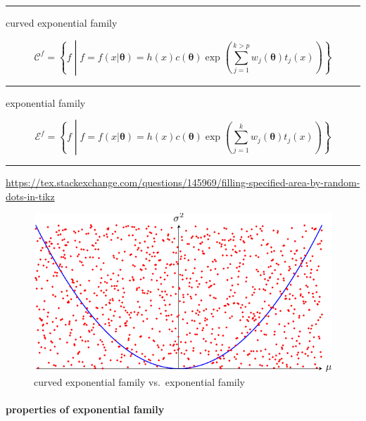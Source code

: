 \documentclass[
]{book}
\theoremstyle{definition}
\theoremstyle{definition}
\theoremstyle{definition}
\theoremstyle{definition}
\theoremstyle{remark}
\begin{document}
\begin{center}\rule{0.5\linewidth}{0.5pt}\end{center}

curved exponential family

\[
\mathcal{C}^{f}=\left\{ f\middle|f=f\left(x|\boldsymbol{\theta}\right)=h\left(x\right)c\left(\boldsymbol{\theta}\right)\exp\left(\sum\limits _{j=1}^{k>p}w_{{\scriptscriptstyle j}}\left(\boldsymbol{\theta}\right)t_{{\scriptscriptstyle j}}\left(x\right)\right)\right\} 
\]

\begin{center}\rule{0.5\linewidth}{0.5pt}\end{center}

exponential family

\[
\mathcal{E}^{f}=\left\{ f\middle|f=f\left(x|\boldsymbol{\theta}\right)=h\left(x\right)c\left(\boldsymbol{\theta}\right)\exp\left(\sum\limits _{j=1}^{k}w_{{\scriptscriptstyle j}}\left(\boldsymbol{\theta}\right)t_{{\scriptscriptstyle j}}\left(x\right)\right)\right\} 
\]

\begin{center}\rule{0.5\linewidth}{0.5pt}\end{center}

\url{https://tex.stackexchange.com/questions/145969/filling-specified-area-by-random-dots-in-tikz}

\begin{figure}
\centering
\includegraphics{202402170031-statistics_files/figure-latex/unnamed-chunk-34-1.pdf}
\caption{\label{fig:unnamed-chunk-34}curved exponential family vs.~exponential family}
\end{figure}

\paragraph{properties of exponential family}\label{properties-of-exponential-family}
\end{document}
